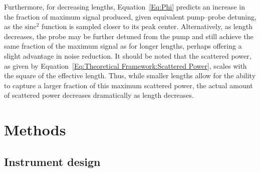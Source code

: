 Furthermore, for decreasing lengths, Equation~\ref{Eq:Phi} predicts an increase in the fraction of maximum signal produced, given equivalent pump--probe detuning, as the \(\mathrm{sinc^2}\) function is sampled closer to its peak center. Alternatively, as length decreases, the probe may be further detuned from the pump and still achieve the same fraction of the maximum signal as for longer lengths, perhaps offering a slight advantage in noise reduction. It should be noted that the scattered power, as given by Equation~\ref{Eq:Theoretical Framework:Scattered Power}, scales with the square of the effective length. Thus, while smaller lengths allow for the ability to capture a larger fraction of this maximum scattered power, the actual amount of scattered power decreases dramatically as length decreases.

\section{Methods}\label{Methods}
\subsection{Instrument design}
\label{Methods:Instrument Design}

